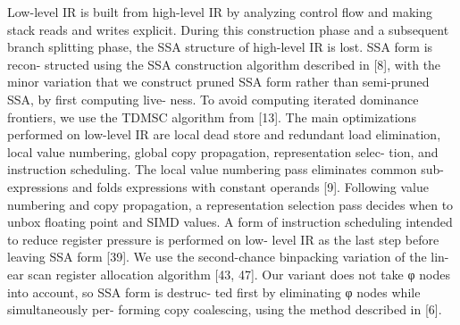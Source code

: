 Low-level IR is built from high-level IR by analyzing control ﬂow and making
stack reads and writes explicit. During this construction phase and a
subsequent branch splitting phase, the SSA structure of high-level IR is lost.
SSA form is recon- structed using the SSA construction algorithm described in
[8], with the minor variation that we construct pruned SSA form rather than
semi-pruned SSA, by ﬁrst computing live- ness. To avoid computing iterated
dominance frontiers, we use the TDMSC algorithm from [13].  The main
optimizations performed on low-level IR are local dead store and redundant load
elimination, local value numbering, global copy propagation, representation
selec- tion, and instruction scheduling.  The local value numbering pass
eliminates common sub- expressions and folds expressions with constant operands
[9]. Following value numbering and copy propagation, a representation selection
pass decides when to unbox ﬂoating point and SIMD values. A form of instruction
scheduling intended to reduce register pressure is performed on low- level IR
as the last step before leaving SSA form [39].  We use the second-chance
binpacking variation of the lin- ear scan register allocation algorithm [43,
47]. Our variant does not take φ nodes into account, so SSA form is destruc-
ted ﬁrst by eliminating φ nodes while simultaneously per- forming copy
coalescing, using the method described in [6].
